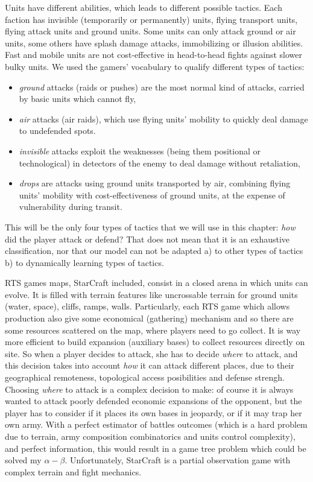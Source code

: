 Units have different abilities, which leads to different possible tactics. Each faction has invisible (temporarily or permanently) units, flying transport units, flying attack units and ground units. Some units can only attack ground or air units, some others have splash damage attacks, immobilizing or illusion abilities. Fast and mobile units are not cost-effective in head-to-head fights against slower bulky units. We used the gamers' vocabulary to qualify different types of tactics: 
\begin{itemize}
    \item \textit{ground} attacks (raids or pushes) are the most normal kind of attacks, carried by basic units which cannot fly,
    \item \textit{air} attacks (air raids), which use flying units' mobility to quickly deal damage to undefended spots.
    \item \textit{invisible} attacks exploit the weaknesses (being them positional or technological) in detectors of the enemy to deal damage without retaliation,
    \item \textit{drops} are attacks using ground units transported by air, combining flying units' mobility with cost-effectiveness of ground units, at the expense of vulnerability during transit.
\end{itemize}
This will be the only four types of tactics that we will use in this chapter: \textit{how} did the player attack or defend? That does not mean that it is an exhaustive classification, nor that our model can not be adapted a) to other types of tactics b) to dynamically learning types of tactics.

RTS games maps, StarCraft included, consist in a closed arena in which units can evolve. It is filled with terrain features like uncrossable terrain for ground units (water, space), cliffs, ramps, walls. Particularly, each RTS game which allows production also give some economical (gathering) mechanism and so there are some resources scattered on the map, where players need to go collect. It is way more efficient to build expansion (auxiliary bases) to collect resources directly on site. So when a player decides to attack, she has to decide \textit{where} to attack, and this decision takes into account \textit{how} it can attack different places, due to their geographical remoteness, topological access posibilities and defense strengh. Choosing \textit{where} to attack is a complex decision to make: of course it is always wanted to attack poorly defended economic expansions of the opponent, but the player has to consider if it places its own bases in jeopardy, or if it may trap her own army. With a perfect estimator of battles outcomes (which is a hard problem due to terrain, army composition combinatorics and units control complexity), and perfect information, this would result in a game tree problem which could be solved my $\alpha-\beta$. Unfortunately, StarCraft is a partial observation game with complex terrain and fight mechanics.

